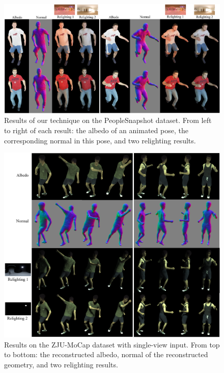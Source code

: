 \begin{figure}[t]
\begin{center}
   \includegraphics[width=1.0\linewidth]{./fig/peoplesnap.png}
\end{center}
\caption{Results of our technique on the PeopleSnapshot dataset. From left to right of each result: the albedo of an animated pose, the corresponding normal in this pose, and two relighting results. }
\label{fig:ps}
\end{figure}

\begin{figure}[t]
\begin{center}
   \includegraphics[width=0.90\linewidth]{./fig/single_view.png}
\end{center}
\caption{Results on the ZJU-MoCap dataset with single-view input. From top to bottom: the reconstructed albedo, normal of the reconstructed geometry, and two relighting results.}
\label{fig:single_view}
\end{figure}

